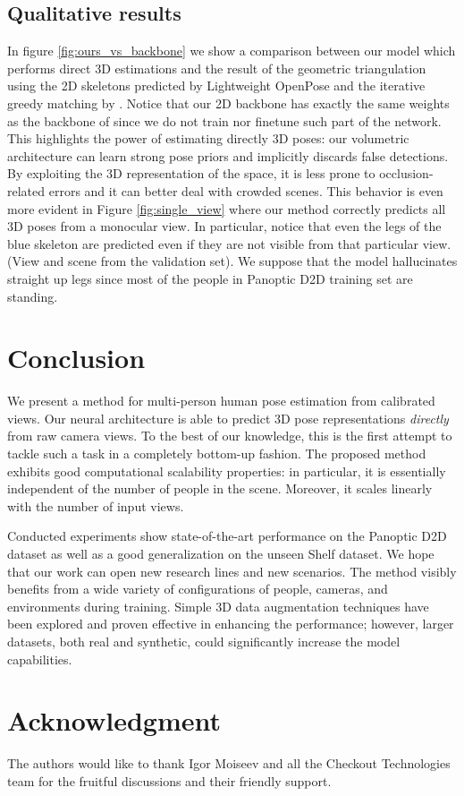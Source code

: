 \documentclass[a4paper,conference]{IEEEtran}
\begin{document}
\subsection{Qualitative results}
In figure \ref{fig:ours_vs_backbone} we show a comparison between our model which performs direct 3D estimations and the result of the geometric triangulation using the 2D skeletons predicted by Lightweight OpenPose\cite{osokin2018lightweight_openpose} and the iterative greedy matching by \cite{tanke2019iterative}. Notice that our 2D backbone has exactly the same weights as the backbone of \cite{osokin2018lightweight_openpose} since we do not train nor finetune such part of the network. This highlights the power of estimating directly 3D poses: our volumetric architecture can learn strong pose priors and implicitly discards false detections. By exploiting the 3D representation of the space, it is less prone to occlusion-related errors and it can better deal with crowded scenes. This behavior is even more evident in Figure \ref{fig:single_view} where our method correctly predicts all 3D poses from a monocular view. In particular, notice that even the legs of the blue skeleton are predicted even if they are not visible from that particular view. (View and scene from the validation set). We suppose that the model hallucinates straight up legs since most of the people in Panoptic D2D training set are standing. 

\section{Conclusion}
We present a method for multi-person human pose estimation from calibrated views. Our neural architecture is able to predict 3D pose representations \emph{directly} from raw camera views. To the best of our knowledge, this is the first attempt to tackle such a task in a completely bottom-up fashion. The proposed method exhibits good computational scalability properties: in particular, it is essentially independent of the number of people in the scene. Moreover, it scales linearly with the number of input views.

Conducted experiments show state-of-the-art performance on the Panoptic D2D dataset as well as a good generalization on the unseen Shelf dataset.
We hope that our work can open new research lines and new scenarios. The method visibly benefits from a wide variety of configurations of people, cameras, and environments during training. Simple 3D data augmentation techniques have been explored and proven effective in enhancing the performance; however, larger datasets, both real and synthetic, could significantly increase the model capabilities.



\section*{Acknowledgment}
The authors would like to thank Igor Moiseev and all the Checkout Technologies team for the fruitful discussions and their friendly support.











\end{document}
